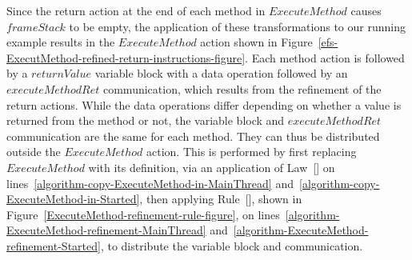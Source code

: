 Since the return action at the end of each method in $ExecuteMethod$
causes $frameStack$ to be empty, the application of these
transformations to our running example results in the $ExecuteMethod$
action shown in
Figure~\ref{efs-ExecutMethod-refined-return-instructions-figure}.
Each method action is followed by a $returnValue$ variable block with
a data operation followed by an $executeMethodRet$ communication,
which results from the refinement of the return actions.
While the data operations differ depending on whether a value is
returned from the method or not, the variable block and
$executeMethodRet$ communication are the same for each method.
They can thus be distributed outside the $ExecuteMethod$ action.
This is performed by first replacing $ExecuteMethod$ with its
definition, via an application of Law~[] on
lines~\ref{algorithm-copy-ExecuteMethod-in-MainThread}
and~\ref{algorithm-copy-ExecuteMethod-in-Started}, then applying
Rule~[], shown in
Figure~\ref{ExecuteMethod-refinement-rule-figure}, on
lines~\ref{algorithm-ExecuteMethod-refinement-MainThread}
and~\ref{algorithm-ExecuteMethod-refinement-Started}, to distribute the
variable block and communication.

